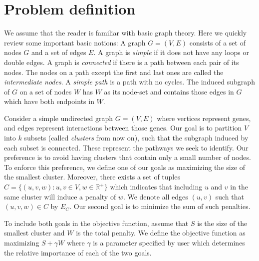 \documentclass[conference,compsoc]{IEEEtran}
\begin{document}
\section{Problem definition}
\label{sec:definition}

We assume that the reader is familiar with basic graph theory. Here we quickly review some important basic notions: A graph $G=(V, E)$ consists of a set of nodes $G$ and a set of edges $E$. A graph is \emph{simple} if it does not have any loops or double edges. A graph is \emph{connected} if there is a path between each pair of its nodes. The nodes on a path except the first and last ones are called the \emph{intermediate nodes}. A \emph{simple path} is a path with no cycles. The induced subgraph of $G$ on a set of nodes $W$ has $W$ as its node-set and contains those edges in $G$ which have both endpoints in $W$. 




Consider a simple undirected graph $G=(V, E)$ where vertices represent genes, and edges represent interactions between those genes. Our goal is to partition $V$
into $k$ subsets (called \emph{clusters} from now on), such that the
subgraph induced by each subset is connected. These represent the pathways we seek to identify. Our preference is to avoid
having clusters that contain only a small number of nodes. To enforce
this preference, we define one of our goals as maximizing the size of
the smallest cluster. Moreover, there exists a set of tuples
$C = \{(u, v, w): u, v \in V, w \in \mathbb{R}^+\}$ which indicates that
including $u$ and $v$ in the same cluster will induce a penalty of $w$. We denote all edges $(u, v)$ such that $(u, v, w) \in C$ by $E_C$. Our second goal is to minimize the sum of such penalties.

To include both goals in the objective function, assume that $S$ is the
size of the smallest cluster and $W$ is the total penalty. We define the
objective function as maximizing $S + \gamma W$ where $\gamma$ is a
parameter specified by user which determines the relative importance of
each of the two goals.
\end{document}
